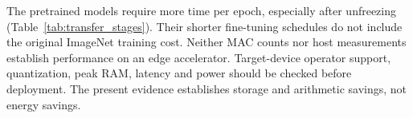 The pretrained models require more time per epoch, especially after unfreezing
(Table~\ref{tab:transfer_stages}). Their shorter fine-tuning schedules do not
include the original ImageNet training cost. Neither MAC counts nor host
measurements establish performance on an edge accelerator. Target-device
operator support, quantization, peak RAM, latency and power should be checked
before deployment. The present evidence establishes storage and arithmetic
savings, not energy savings.
